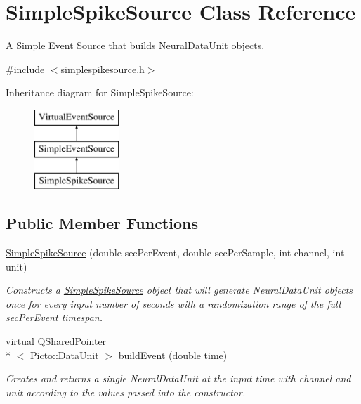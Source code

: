\hypertarget{class_simple_spike_source}{\section{Simple\-Spike\-Source Class Reference}
\label{class_simple_spike_source}
}


A Simple Event Source that builds Neural\-Data\-Unit objects.  




{\ttfamily \#include $<$simplespikesource.\-h$>$}

Inheritance diagram for Simple\-Spike\-Source\-:\begin{figure}[H]
\begin{center}
\leavevmode
\includegraphics[height=3.000000cm]{class_simple_spike_source}
\end{center}
\end{figure}
\subsection*{Public Member Functions}
\begin{DoxyCompactItemize}
\item 
\hyperlink{class_simple_spike_source_a2b8c8ff96886a40df27b6d5cd6f08d20}{Simple\-Spike\-Source} (double sec\-Per\-Event, double sec\-Per\-Sample, int channel, int unit)
\begin{DoxyCompactList}\small\item\em Constructs a \hyperlink{class_simple_spike_source}{Simple\-Spike\-Source} object that will generate Neural\-Data\-Unit objects once for every input number of seconds with a randomization range of the full sec\-Per\-Event timespan. \end{DoxyCompactList}\item 
virtual Q\-Shared\-Pointer\\*
$<$ \hyperlink{class_picto_1_1_data_unit}{Picto\-::\-Data\-Unit} $>$ \hyperlink{class_simple_spike_source_a42730994330acdf1d66e3b232d86f276}{build\-Event} (double time)
\begin{DoxyCompactList}\small\item\em Creates and returns a single Neural\-Data\-Unit at the input time with channel and unit according to the values passed into the constructor. \end{DoxyCompactList}\end{DoxyCompactItemize}
